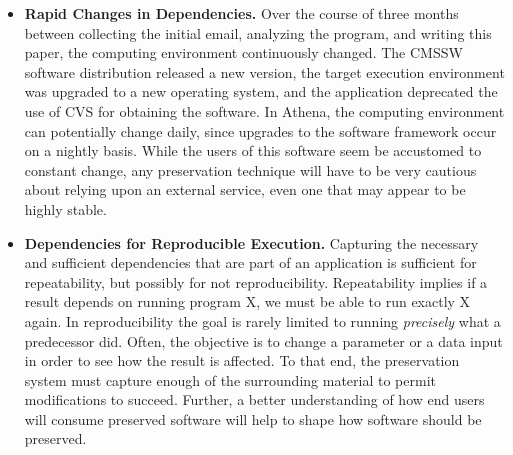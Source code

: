 \begin{itemize}
\item {\bf Rapid Changes in Dependencies.}  Over the course of three months
between collecting the initial email, analyzing the program, and writing this
paper, the computing environment continuously changed.  The CMSSW software
distribution released a new version, the target execution environment was upgraded
to a new operating system, and the application deprecated the use of CVS for obtaining
the software. In Athena, the computing environment can potentially change daily, since upgrades to the software framework occur on a nightly basis.  
While the users of this software seem be accustomed to constant change,
any preservation technique will have to be very cautious about relying upon an
external service, even one that may appear to be highly stable.

\item {\bf Dependencies for Reproducible Execution.} Capturing the necessary and sufficient dependencies that are part of an application is sufficient for repeatability, but possibly for not reproducibility.
Repeatability implies if a result depends on running program X, we must be able to run exactly X again. In reproducibility the goal is rarely limited to running
\emph{precisely} what a predecessor did. Often, the objective is to
change a parameter or a data input in order to see how the result is affected. To that end, the preservation system must capture enough of the surrounding
material to permit modifications to succeed. 
Further, a better understanding of how end users will consume preserved software will help to shape how
software should be preserved.
\end{itemize}


